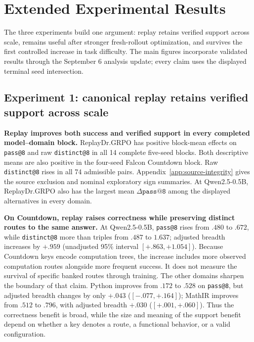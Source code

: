 \section{Extended Experimental Results}
\label{app:extended-results}

The three experiments build one argument: replay retains verified support
across scale, remains useful after stronger fresh-rollout optimization, and
survives the first controlled increase in task difficulty. The main figures
incorporate validated results through the September 6 analysis update; every
claim uses the displayed terminal seed intersection.

\subsection{Experiment 1: canonical replay retains verified support across scale}
\label{app:results-retention}

\textbf{Replay improves both success and verified support in every completed
model--domain block.} ReplayDr.GRPO has positive block-mean effects on
\texttt{pass@8} and raw \texttt{distinct@8} in all 14 complete five-seed
blocks. Both descriptive means are also positive in the four-seed Falcon
Countdown block. Raw \texttt{distinct@8} rises in all 74 admissible pairs.
Appendix~\ref{app:source-integrity} gives the source exclusion and nominal
exploratory sign summaries. At
Qwen2.5-0.5B, ReplayDr.GRPO also has the largest mean
\(\Delta\texttt{pass@8}\) among the displayed alternatives in every domain.

\textbf{On Countdown, replay raises correctness while preserving distinct
routes to the same answer.} At Qwen2.5-0.5B, \texttt{pass@8} rises from
\(.480\) to \(.672\), while \texttt{distinct@8} more than triples from
\(.487\) to \(1.637\); adjusted breadth increases by \(+.959\)
(unadjusted 95\% interval \([+.863,+1.054]\)). Because Countdown keys encode
computation trees, the increase includes more observed computation routes
alongside more frequent success. It does not measure the survival of specific
banked routes through training. The other
domains sharpen the boundary of that claim. Python improves from \(.172\) to
\(.528\) on \texttt{pass@8}, but adjusted breadth changes by only \(+.043\)
(\([-.077,+.164]\)); MathIR improves from \(.512\) to \(.796\), with
adjusted breadth \(+.030\) (\([+.001,+.060]\)). Thus the correctness benefit
is broad, while the size and meaning of the support benefit depend on whether a
key denotes a route, a functional behavior, or a valid configuration.

